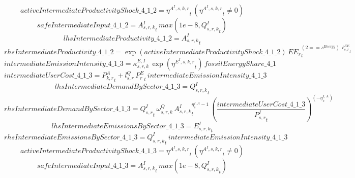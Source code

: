 \begin{dmath*}
activeIntermediateProductivityShock\_4\_1\_2 = {{\eta^{A^{I},s,k,r}}}_{t}\, \left({{\eta^{A^{I},s,k,r}}}_{t}\neq 0\right)
\end{dmath*}
\begin{dmath*}
safeIntermediateInput\_4\_1\_2 = {{A^{I}_{s,r,k}}}_{t}\, max(1e-8,{{Q^{I}_{s,r,k}}}_{t})
\end{dmath*}
\begin{dmath*}
lhsIntermediateProductivity\_4\_1\_2 = {{A^{I}_{s,r,k}}}_{t}
\end{dmath*}
\begin{dmath*}
rhsIntermediateProductivity\_4\_1\_2 = \exp\left({activeIntermediateProductivityShock\_4\_1\_2}\right)\, {{EE_r}}_{t}^{\left(2=={{s^{Energy}}}\right)\, {{\ell^{EE}_{s,r}}}_{t}}
\end{dmath*}
\begin{dmath*}
intermediateEmissionIntensity\_4\_1\_3 = {{\kappa^{E,I}_{s,r,k}}}\, \exp\left({{\eta^{E^{I},s,k,r}}}_{t}\right)\, {fossilEnergyShare\_4\_1}
\end{dmath*}
\begin{dmath*}
intermediateUserCost\_4\_1\_3 = {{P^{A}_{k,r}}}_{t}+{{l^{Q}_{s,r}}}\, {{P^E_r}}_{t}\, {intermediateEmissionIntensity\_4\_1\_3}
\end{dmath*}
\begin{dmath*}
lhsIntermediateDemandBySector\_4\_1\_3 = {{Q^{I}_{s,r,k}}}_{t}
\end{dmath*}
\begin{dmath*}
rhsIntermediateDemandBySector\_4\_1\_3 = {{Q^{I}_{s,r}}}_{t}\, {{\omega^{Q}_{s,r,k}}}\, {{A^{I}_{s,r,k}}}_{t}^{{{\eta^{I,A}_{s}}}-1}\, \left(\frac{{intermediateUserCost\_4\_1\_3}}{{{P^{I}_{s,r}}}_{t}}\right)^{\left(-{{\eta^{I,A}_{s}}}\right)}
\end{dmath*}
\begin{dmath*}
lhsIntermediateEmissionsBySector\_4\_1\_3 = {{E^I_{s,r,k}}}_{t}
\end{dmath*}
\begin{dmath*}
rhsIntermediateEmissionsBySector\_4\_1\_3 = {{Q^{I}_{s,r,k}}}_{t}\, {intermediateEmissionIntensity\_4\_1\_3}
\end{dmath*}
\begin{dmath*}
activeIntermediateProductivityShock\_4\_1\_3 = {{\eta^{A^{I},s,k,r}}}_{t}\, \left({{\eta^{A^{I},s,k,r}}}_{t}\neq 0\right)
\end{dmath*}
\begin{dmath*}
safeIntermediateInput\_4\_1\_3 = {{A^{I}_{s,r,k}}}_{t}\, max(1e-8,{{Q^{I}_{s,r,k}}}_{t})
\end{dmath*}
